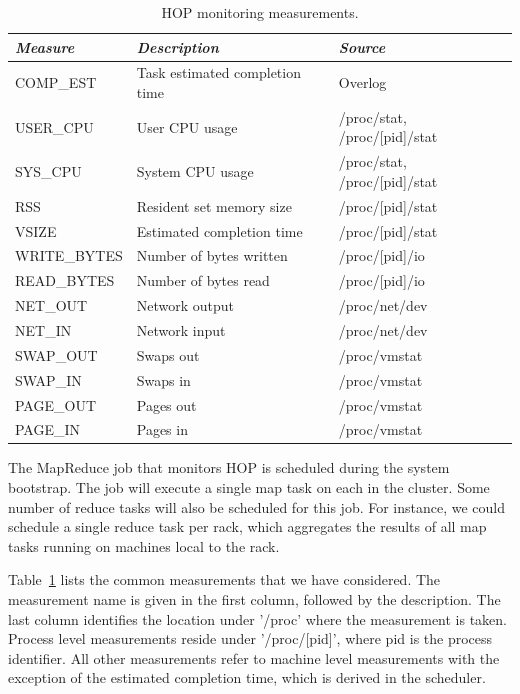 \begin{table}
\ssp
\centering
\begin{tabular}{|l|l|l|} \hline
\textit{Measure}    & \textit{Description}                 & \textit{Source} \\ \hline \hline
COMP\_EST        & Task estimated completion time  & Overlog \\ \hline
USER\_CPU        & User CPU usage                   & /proc/stat, /proc/[pid]/stat \\ \hline
SYS\_CPU           & System CPU usage              & /proc/stat, /proc/[pid]/stat \\ \hline
RSS                       & Resident set memory size   & /proc/[pid]/stat   \\ \hline
VSIZE                    & Estimated completion time  & /proc/[pid]/stat  \\ \hline
WRITE\_BYTES   & Number of bytes written       & /proc/[pid]/io  \\ \hline
READ\_BYTES   & Number of bytes read           & /proc/[pid]/io \\ \hline
NET\_OUT           & Network output                      & /proc/net/dev \\ \hline
NET\_IN               & Network input                        & /proc/net/dev \\ \hline
SWAP\_OUT       & Swaps out                              & /proc/vmstat  \\ \hline
SWAP\_IN           &  Swaps in                               & /proc/vmstat \\ \hline
PAGE\_OUT       & Pages out                               & /proc/vmstat \\ \hline
PAGE\_IN           & Pages in                                 & /proc/vmstat \\ \hline
\end{tabular}
\caption{HOP monitoring measurements.}
\label{ch:hop:tbl:measure}
\end{table}

The MapReduce job that monitors HOP is scheduled during the system bootstrap. The job will execute
a single map task on each \TT in the cluster. Some number of reduce tasks will also be scheduled for this 
job. For instance, we could schedule a single reduce task per rack, which aggregates the results of all
map tasks running on machines local to the rack. 

Table~\ref{ch:hop:tbl:measure} lists the common measurements that we have considered. The 
measurement name is given in the first column, followed by the description. The last column
identifies the location under '/proc' where the measurement is taken. Process level measurements 
reside under '/proc/[pid]', where pid is the process identifier. All other measurements refer to machine
level measurements with the exception of the estimated completion time, which is derived in the scheduler.

